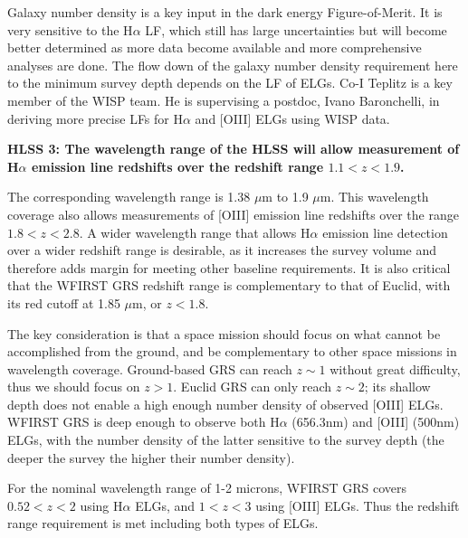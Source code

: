  Galaxy number density is a key input in the dark energy Figure-of-Merit. It
 is very sensitive to the H$\alpha$ LF, which still has large uncertainties but will
 become better determined as more data become available and more comprehensive
 analyses are done. The flow down of the galaxy number density requirement here
 to the minimum survey depth depends on the LF of ELGs.
 Co-I Teplitz is a key member of the WISP team. He is supervising a postdoc, Ivano Baronchelli,
 in deriving more precise LFs for H$\alpha$ and [OIII] ELGs using WISP data.


 \noindent
 {\bf HLSS 3: The wavelength range of the HLSS will allow measurement of H$\alpha$ emission
 line redshifts over the redshift range $1.1 < z < 1.9$.}

 The corresponding wavelength range is 1.38 $\mu$m to 1.9 $\mu$m.  This wavelength
 coverage also allows measurements of [OIII] emission line redshifts over the
 range $1.8 < z < 2.8$.  A wider wavelength range that allows H$\alpha$ emission line
 detection over a wider redshift range is desirable, as it increases the survey
 volume and therefore adds margin for meeting other baseline requirements.  It is
 also critical that the WFIRST GRS redshift range is complementary to that of
 Euclid, with its red cutoff at 1.85 $\mu$m, or $z < 1.8$.

 The key consideration is that a space mission should focus on what cannot be
 accomplished from the ground, and be complementary to other space missions in
 wavelength coverage. Ground-based GRS can reach $z\sim1$ without great difficulty,
 thus we should focus on $z>1$. Euclid GRS can only reach $z \sim2$; its shallow depth
 does not enable a high enough number density of observed [OIII] ELGs. WFIRST GRS
 is deep enough to observe both H$\alpha$ (656.3nm) and [OIII] (500nm) ELGs, with the
 number density of the latter sensitive to the survey depth (the deeper the
 survey the higher their number density).

 For the nominal wavelength range of 1-2 microns, WFIRST GRS covers $0.52 < z <
 2$ using H$\alpha$ ELGs, and $1 < z < 3$ using [OIII] ELGs. Thus the redshift range
 requirement is met including both types of ELGs.

